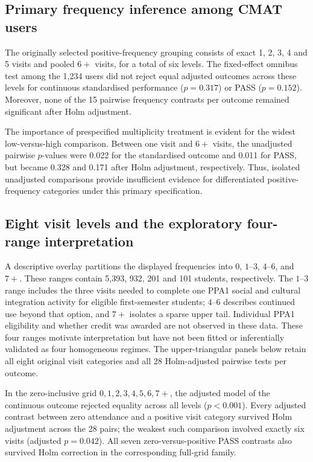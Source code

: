 \subsection{Primary frequency inference among CMAT users}

The originally selected positive-frequency grouping consists of exact 1, 2, 3, 4 and 5 visits and pooled $6+$ visits, for a total of six levels. The fixed-effect omnibus test among the 1,234 users did not reject equal adjusted outcomes across these levels for continuous standardised performance ($p=0.317$) or PASS ($p=0.152$). Moreover, none of the 15 pairwise frequency contrasts per outcome remained significant after Holm adjustment.

The importance of prespecified multiplicity treatment is evident for the widest low-versus-high comparison. Between one visit and $6+$ visits, the unadjusted pairwise $p$-values were 0.022 for the standardised outcome and 0.011 for PASS, but became 0.328 and 0.171 after Holm adjustment, respectively. Thus, isolated unadjusted comparisons provide insufficient evidence for differentiated positive-frequency categories under this primary specification.

\subsection{Eight visit levels and the exploratory four-range interpretation}

A descriptive overlay partitions the displayed frequencies into $0$, $1$--$3$, $4$--$6$, and $7+$. These ranges contain 5,393, 932, 201 and 101 students, respectively. The $1$--$3$ range includes the three visits needed to complete one PPA1 social and cultural integration activity for eligible first-semester students; $4$--$6$ describes continued use beyond that option, and $7+$ isolates a sparse upper tail. Individual PPA1 eligibility and whether credit was awarded are not observed in these data. These four ranges motivate interpretation but have not been fitted or inferentially validated as four homogeneous regimes. The upper-triangular panels below retain all eight original visit categories and all 28 Holm-adjusted pairwise tests per outcome.



In the zero-inclusive grid $0,1,2,3,4,5,6,7+$, the adjusted model of the continuous outcome rejected equality across all levels ($p<0.001$). Every adjusted contrast between zero attendance and a positive visit category survived Holm adjustment across the 28 pairs; the weakest such comparison involved exactly six visits (adjusted $p=0.042$). All seven zero-versus-positive PASS contrasts also survived Holm correction in the corresponding full-grid family.

